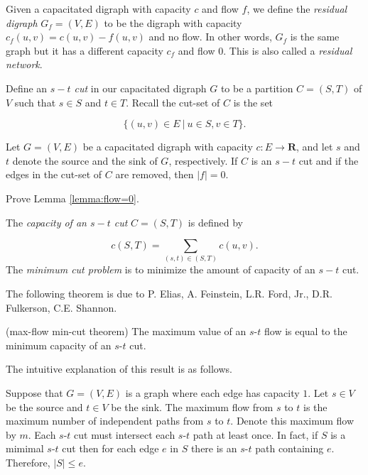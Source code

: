 Given a capacitated digraph with capacity $c$ and flow $f$,
we define the {\it residual digraph} $G_f=(V,E)$ to be the 
digraph with capacity $c_f(u,v) = c(u,v) - f(u,v)$ and no flow. 
In other words, $G_f$ is the same graph but it has a different
capacity $c_f$ and flow $0$.
This is also called a {\it residual network}.

Define an {\it $s-t$ cut} in our capacitated digraph $G$
to be a partition $C = (S,T)$ of $V$ such that 
$s \in S$ and $t\in T$. 
Recall the cut-set of $C$ is the set 

\[
\{(u,v)\in E\ |\ u\in S, v\in T\}. 
\]

\begin{lemma}
\label{lemma:flow=0}
{\rm
Let $G = (V, E)$ be a capacitated digraph with
capacity $c: E\to {\mathbf{R}}$, and let
$s$ and $t$ denote the source and the sink of $G$, respectively.
If $C$ is an $s-t$ cut and if 
the edges in the cut-set of $C$ are removed, then $| f | = 0$.
}
\end{lemma}

\begin{exercise}
Prove Lemma \ref{lemma:flow=0}.
\end{exercise}

The {\it capacity of an $s-t$ cut} 
$C = (S,T)$ is defined by 

\[
c(S,T) = \sum_{(s,t)\in (S,T)} c(u,v).
\]
The {\it minimum cut problem} 
is to minimize the amount of capacity of an $s-t$ cut.

The following theorem is due to P. Elias, A. Feinstein, L.R. Ford,
Jr.,  D.R. Fulkerson, C.E. Shannon.

\begin{theorem}
(max-flow min-cut theorem)
{\rm
The maximum value of an $s$-$t$ flow is equal to the minimum capacity of
an $s$-$t$ cut.
}
\end{theorem}

The intuitive explanation of this result is as follows.

Suppose that $G=(V,E)$ is a graph where each edge has capacity $1$.
Let $s\in V$ be the source and $t\in V$ be the sink.
The maximum flow from $s$ to $t$ is the maximum number of 
independent paths from $s$ to $t$.
Denote this maximum flow by $m$.
Each $s$-$t$ cut must intersect each $s$-$t$ path at least once.
In fact, if $S$ is a mimimal $s$-$t$ cut then for each 
edge $e$ in $S$ there is an $s$-$t$ path containing
$e$. Therefore, $|S|\leq e$.

